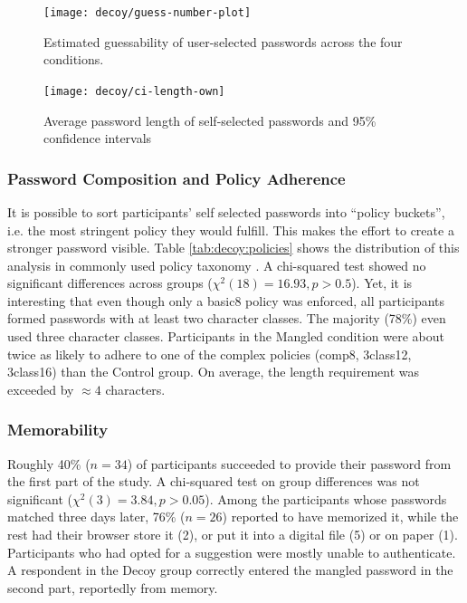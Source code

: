 \begin{figure}
	\centering
	\texttt{[image: decoy/guess-number-plot]}
	\caption{\label{fig:decoy:guess-number-plot} Estimated guessability of user-selected passwords across the four conditions.}
\end{figure}

\begin{figure}
	\centering
	\texttt{[image: decoy/ci-length-own]}
	\caption{\label{fig:decoy:ci-length-own} Average password length of self-selected passwords and 95\% confidence intervals}
\end{figure}


\subsubsection{Password Composition and Policy Adherence}
It is possible to sort participants' self selected passwords into ``policy buckets'', i.e. the most stringent policy they would fulfill. This makes the effort to create a stronger password visible. Table \ref{tab:decoy:policies} shows the distribution of this analysis in commonly used policy taxonomy \cite{Shay2014CanLongPasswordsBeSecureAndUsable}. 
A chi-squared test showed no significant differences across groups ($\chi^2(18)=16.93,p>0.5$). Yet, it is interesting that even though only a basic8 policy was enforced, all participants formed passwords with at least two character classes. The majority (78\%) even used three character classes. Participants in the Mangled condition were about twice as likely to adhere to one of the complex policies (comp8, 3class12, 3class16) than the Control group. On average, the length requirement was exceeded by $\approx 4$ characters. 

\subsubsection{Memorability}
Roughly 40\% ($n=34$) of participants succeeded to provide their password from the first part of the study. A chi-squared test on group differences was not significant ($\chi^2(3)=3.84,p>0.05$). Among the participants whose passwords matched three days later, 76\% ($n=26$) reported to have memorized it, while the rest had their browser store it (2), or put it into a digital file (5) or on paper (1). Participants who had opted for a suggestion were mostly unable to authenticate. A respondent in the Decoy group correctly entered the mangled password in the second part, reportedly from memory. %

